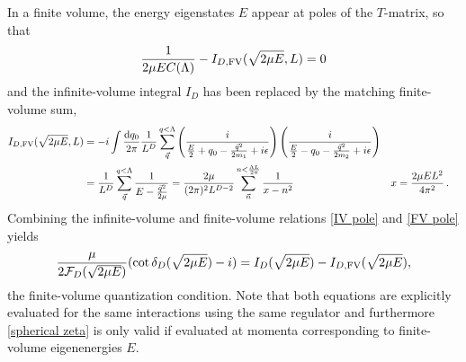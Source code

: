 In a finite volume, the energy eigenstates $E$ appear at poles of the $T$-matrix, so that
\begin{equation}\label{eq:FV pole}
    \frac{1}{2\mu E C(\Lambda) } - I_{D, \textrm{FV}}(\sqrt{2\mu E},L) = 0
\end{equation}
and the infinite-volume integral $I_D$ has been replaced by the matching finite-volume sum,
\begin{align}
I_{D,\textrm{FV}}(\sqrt{2\mu E},L)
    &=-i\int \frac { \mathrm {d}q_0}{2\pi} \frac{1}{L^D}\sum_{\vec{q}}^{q < \Lambda} \left( \frac { i } { \frac{E}{2} + q _ { 0 } - \frac{\vec{q}^2}{2m_1} + i \epsilon } \right) \left( \frac { i } { \frac{E}{2} - q _ { 0 } - \frac{\vec{q}^2}{2m_2} + i \epsilon } \right)
    \\
    \label{eq:I0 FV}
    &=\frac{1}{L^D}\sum_{\vec{q}}^{q < \Lambda} \frac { 1 } { E - \frac{\vec{q}^2}{2\mu} }
    =\frac{2\mu}{(2\pi)^2 L^{D-2}} \sum_{\vec{n}}^{n < \frac{\Lambda L}{2\pi}} \frac{1}{x-n^2}
    &
    x &= \frac{2\mu E L^2}{4\pi^2}
    \, .
\end{align}
Combining the infinite-volume and finite-volume relations \eqref{IV pole} and \eqref{FV pole} yields
\begin{equation}\label{eq:spherical zeta}
    \frac{\mu}{2\mathcal{F}_{D}(\sqrt{2\mu E})}(\cot\delta_{D}(\sqrt{2\mu E})-i) = I_D(\sqrt{2\mu E}) - I_{D,\textrm{FV}}(\sqrt{2\mu E}),
\end{equation}
the finite-volume quantization condition.
Note that both equations are explicitly evaluated for the same interactions using the same regulator and furthermore \eqref{spherical zeta} is only valid if evaluated at momenta corresponding to finite-volume eigenenergies $E$.

